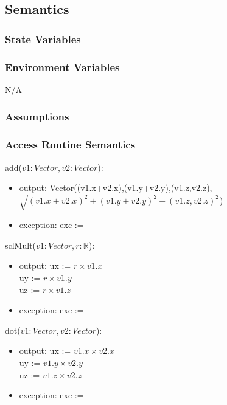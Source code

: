 \documentclass[12pt, titlepage]{article}
\begin{document}
\subsection{Semantics}
\subsubsection{State Variables}

\subsubsection{Environment Variables}
N/A

\subsubsection{Assumptions}

\subsubsection{Access Routine Semantics}
\noindent add($v1:Vector, v2:Vector$):
\begin{itemize}
	\item output: 
	Vector((v1.x+v2.x),(v1.y+v2.y),(v1.z,v2.z),$\sqrt{(v1.x+v2.x)^2+(v1.y+v2.y)^2+(v1.z,v2.z)^2}$)
	\item exception: exc := \\
\end{itemize}

\noindent sclMult($v1:Vector, r:\mathbb{R}$):
\begin{itemize}
	\item output: 
	ux := $r \times v1.x$ \\
	uy := $r \times v1.y$ \\
	uz := $r \times v1.z$ \\	
	\item exception: exc := \\
\end{itemize}


\noindent dot($v1:Vector, v2:Vector$):
\begin{itemize}
	\item output: 
	ux := $v1.x \times v2.x$ \\
	uy := $v1.y \times v2.y$ \\
	uz := $v1.z \times v2.z$ \\
	\item exception: exc := \\
\end{itemize}
\end{document}
